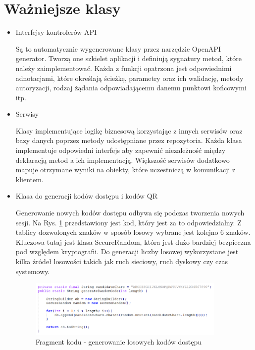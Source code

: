 \section{Ważniejsze klasy}
\begin{itemize}
\item Interfejsy kontrolerów API

Są to automatycznie wygenerowane klasy przez narzędzie OpenAPI generator. Tworzą one szkielet aplikacji i definiują sygnatury metod, które należy zaimplementować. Każda z funkcji opatrzona jest odpowiednimi adnotacjami, które określają ścieżkę, parametry oraz ich walidację, metody autoryzacji, rodzaj żądania odpowiadającemu danemu punktowi końcowymi itp.

\item Serwisy

Klasy implementujące logikę biznesową korzystając z innych serwisów oraz bazy danych poprzez metody udostępniane przez repozytoria. Każda klasa implementuje odpowiedni interfejs aby zapewnić niezależność między deklaracją metod a ich implementacją. Większość serwisów dodatkowo mapuje otrzymane wyniki na obiekty, które uczestniczą w komunikacji z klientem.

\item Klasa do generacji kodów dostępu i kodów QR

Generowanie nowych kodów dostępu odbywa się podczas tworzenia nowych sesji. Na Rys. \ref{fig:code-generation} przedstawiony jest kod, który jest za to odpowiedzialny. Z tablicy dozwolonych znaków w sposób losowy wybrane jest kolejno 6 znaków. Kluczowa tutaj jest klasa SecureRandom, która jest dużo bardziej bezpieczna pod względem kryptografii. Do generacji liczby losowej wykorzystane jest kilka źródeł losowości takich jak ruch sieciowy, ruch dyskowy czy czas systemowy. 

\begin{figure}[h]
\centering
\includegraphics[width=0.9\textwidth]{./graf/code_generation.PNG}
\caption{Fragment kodu - generowanie losowych kodów dostępu}
\label{fig:code-generation}
\end{figure}

\end{itemize}
